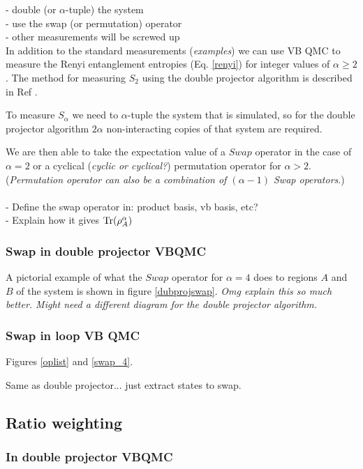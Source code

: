 \documentclass[prb,aps,twocolumn,floatfix,amsmath,amssymb,superscriptaddress,tightenlines]{revtex4}
\begin{document}
\noindent
- {double (or $\alpha$-tuple) the system}\\
- {use the swap (or permutation) operator}\\
- {other measurements will be screwed up} \\




In addition to the standard measurements ({\it examples}) we can use VB QMC to measure the Renyi entanglement entropies (Eq. \eqref{renyi}) for integer values of $\alpha \ge 2$.  
The method for measuring $S_2$ using the double projector algorithm is described in Ref \cite{our paper}.

To measure $S_{\alpha}$ we need to $\alpha$-tuple the system that is simulated,
so for the double projector algorithm $2\alpha$ non-interacting copies of that system are required.  

We are then able to take the expectation value of a $Swap$ operator in the case of $\alpha = 2$ or a cyclical ({\it cyclic or cyclical?}) permutation operator for $\alpha > 2$. 
({\it Permutation operator can also be a combination of $(\alpha - 1)$ Swap operators}.)
\\\\
- Define the swap operator in: product basis, vb basis, etc?\\
- Explain how it gives ${\rm Tr} (\rho_A^{\alpha})$

\subsubsection{Swap in double projector VBQMC}
A pictorial example of what the $Swap$ operator for $\alpha = 4$ does to regions $A$ and $B$ of the system is shown in figure \ref{dubprojswap}. {\it Omg explain this so much better.  Might need a different diagram for the double projector algorithm.}

\subsubsection{Swap in  loop VB QMC}
Figures \ref{oplist} and \ref{swap_4}.

Same as double projector... just extract states to swap.

\subsection{Ratio weighting}

\subsubsection{In double projector VBQMC}
\end{document}

